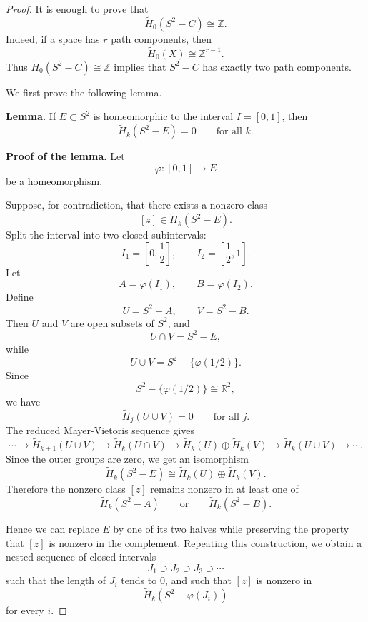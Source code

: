 \documentclass[11pt,a4paper]{article}
\theoremstyle{definition}
\theoremstyle{plain}
\theoremstyle{remark}
\newcommand{\1}{\mathbbm{1}}
\begin{document}
\begin{proof}
    It is enough to prove that
    \[
        \widetilde H_0(S^2-C)\cong \mathbb Z.
    \]
    Indeed, if a space has $r$ path components, then
    \[
        \widetilde H_0(X)\cong \mathbb Z^{r-1}.
    \]
    Thus $\widetilde H_0(S^2-C)\cong \mathbb Z$ implies that $S^2-C$ has exactly two path components.

    We first prove the following lemma.

    \medskip

    \noindent
    \textbf{Lemma.} If $E\subset S^2$ is homeomorphic to the interval $I=[0,1]$, then
    \[
        \widetilde H_k(S^2-E)=0
        \qquad
        \text{for all } k.
    \]

    \medskip

    \noindent
    \textbf{Proof of the lemma.}
    Let
    \[
        \varphi : [0,1]\to E
    \]
    be a homeomorphism.

    Suppose, for contradiction, that there exists a nonzero class
    \[
        [z]\in \widetilde H_k(S^2-E).
    \]
    Split the interval into two closed subintervals:
    \[
        I_1=\left[0,\frac12\right],
        \qquad
        I_2=\left[\frac12,1\right].
    \]
    Let
    \[
        A=\varphi(I_1),
        \qquad
        B=\varphi(I_2).
    \]
    Define
    \[
        U=S^2-A,
        \qquad
        V=S^2-B.
    \]
    Then $U$ and $V$ are open subsets of $S^2$, and
    \[
        U\cap V = S^2-E,
    \]
    while
    \[
        U\cup V = S^2-\{\varphi(1/2)\}.
    \]
    Since
    \[
        S^2-\{\varphi(1/2)\}\cong \mathbb R^2,
    \]
    we have
    \[
        \widetilde H_j(U\cup V)=0
        \qquad
        \text{for all } j.
    \]
    The reduced Mayer-Vietoris sequence gives
    \[
        \cdots
        \to
        \widetilde H_{k+1}(U\cup V)
        \to
        \widetilde H_k(U\cap V)
        \to
        \widetilde H_k(U)\oplus \widetilde H_k(V)
        \to
        \widetilde H_k(U\cup V)
        \to
        \cdots.
    \]
    Since the outer groups are zero, we get an isomorphism
    \[
        \widetilde H_k(S^2-E)
        \cong
        \widetilde H_k(U)\oplus \widetilde H_k(V).
    \]
    Therefore the nonzero class $[z]$ remains nonzero in at least one of
    \[
        \widetilde H_k(S^2-A)
        \qquad \text{or} \qquad
        \widetilde H_k(S^2-B).
    \]

    Hence we can replace $E$ by one of its two halves while preserving the property that $[z]$ is nonzero in the complement. Repeating this construction, we obtain a nested sequence of closed intervals
    \[
        J_1 \supset J_2 \supset J_3 \supset \cdots
    \]
    such that the length of $J_i$ tends to $0$, and such that $[z]$ is nonzero in
    \[
        \widetilde H_k(S^2-\varphi(J_i))
    \]
    for every $i$.


\end{proof}
\end{document}
